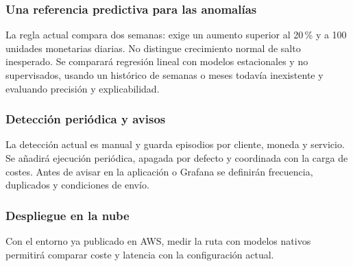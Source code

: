\subsubsection{Una referencia predictiva para las anomalías}
La regla actual compara dos semanas: exige un aumento superior al 20\,\% y a 100 unidades monetarias diarias. No distingue crecimiento normal de salto inesperado. Se comparará regresión lineal con modelos estacionales y no supervisados, usando un histórico de semanas o meses todavía inexistente y evaluando precisión y explicabilidad. \cite{detector-anomalias}

\subsubsection{Detección periódica y avisos}
La detección actual es manual y guarda episodios por cliente, moneda y servicio. Se añadirá ejecución periódica, apagada por defecto y coordinada con la carga de costes. Antes de avisar en la aplicación o Grafana se definirán frecuencia, duplicados y condiciones de envío.

\subsubsection{Despliegue en la nube}
Con el entorno ya publicado en AWS, medir la ruta con modelos nativos permitirá comparar coste y latencia con la configuración actual.
